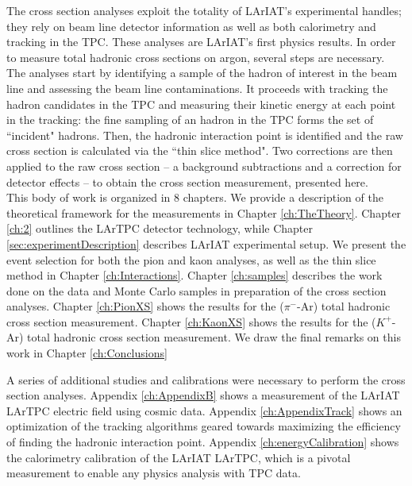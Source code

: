 The cross section analyses exploit the totality of LArIAT's experimental handles; they rely on beam line detector information as well as both calorimetry and tracking in the TPC. These analyses are LArIAT's first physics results. 
In order to measure total hadronic cross sections on argon, several steps are necessary. The analyses start by identifying a sample of the hadron of interest in the beam line and assessing the beam line contaminations. It proceeds with tracking the hadron candidates in the TPC and measuring their kinetic energy at each point in the tracking: the fine sampling of an hadron in the TPC forms the set of ``incident" hadrons.  Then, the hadronic interaction point is identified and the raw cross section is calculated via the ``thin slice method". Two corrections are then applied to the raw cross section -- a background subtractions and a correction for detector effects -- to obtain the cross section measurement, presented here.\\

This body of work is organized in 8 chapters.
We provide a description of the theoretical framework for the measurements in  Chapter \ref{ch:TheTheory}. Chapter \ref{ch:2} outlines the LArTPC detector technology, while
Chapter \ref{sec:experimentDescription} describes LArIAT experimental setup. We present the event selection for both the pion and kaon analyses, as well as the thin slice method in Chapter \ref{ch:Interactions}.  Chapter \ref{ch:samples}  describes the work done on the data and Monte Carlo samples in preparation of the cross section analyses.
Chapter \ref{ch:PionXS} shows  the results for the ($\pi^-$-Ar) total hadronic cross section measurement. Chapter \ref{ch:KaonXS} shows  the results for the ($K^+$-Ar) total hadronic cross section measurement. We draw the final remarks on this work in Chapter \ref{ch:Conclusions}

A series of additional studies and calibrations were necessary to perform the cross section analyses. Appendix \ref{ch:AppendixB} shows a measurement of the LArIAT LArTPC electric field using cosmic data. Appendix \ref{ch:AppendixTrack} shows an optimization of the tracking algorithms geared towards maximizing the efficiency of finding the hadronic interaction point. Appendix \ref{ch:energyCalibration} shows the calorimetry calibration of the LArIAT LArTPC, which is a pivotal measurement to enable any physics analysis with TPC data.  


